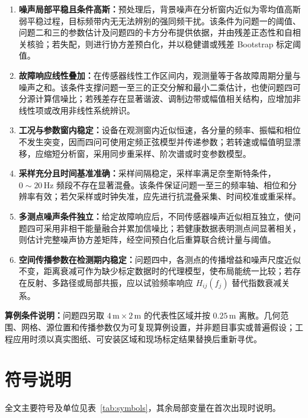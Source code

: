 \documentclass[withoutpreface,bwprint]{cumcmthesis}
\begin{document}
\begin{enumerate}[label=假设\arabic*：,leftmargin=4em]
    \item \textbf{噪声局部平稳且条件高斯：}预处理后，背景噪声在分析窗内近似为零均值高斯弱平稳过程，目标频带内无无法辨别的强同频干扰。该条件为问题一的阈值、问题二和三的参数估计及问题四的卡方分布提供依据，并由残差正态性和自相关核验；若失配，则进行协方差预白化，并以稳健谱或残差 Bootstrap 标定阈值。
    \item \textbf{故障响应线性叠加：}在传感器线性工作区间内，观测量等于各故障周期分量与噪声之和。该条件支撑问题一至三的正交分解和最小二乘估计，也使问题四可分源计算信噪比；若残差存在显著谐波、调制边带或幅值相关结构，应增加非线性项或改用非线性系统辨识。
    \item \textbf{工况与参数窗内稳定：}设备在观测窗内近似恒速，各分量的频率、振幅和相位不发生突变，因而四问可使用定频正弦模型并传递参数；若转速或幅值明显漂移，应缩短分析窗，采用同步重采样、阶次谱或时变参数模型。
    \item \textbf{采样充分且时间基准准确：}采样间隔稳定，采样率满足奈奎斯特条件，\(0\sim20\,\mathrm{Hz}\) 频段不存在显著混叠。该条件保证问题一至三的频率轴、相位和分辨率有效；若欠采样或时钟失准，应先进行抗混叠采集、时间校准或重采样。
    \item \textbf{多测点噪声条件独立：}给定故障响应后，不同传感器噪声近似相互独立，使问题四可采用非相干能量融合并累加信噪比；若健康数据表明测点间显著相关，则估计完整噪声协方差矩阵，经空间预白化后重算联合统计量与阈值。
    \item \textbf{空间传播参数在检测期内稳定：}问题四中，各测点的传播增益和噪声尺度近似不变，距离衰减可作为缺少标定数据时的代理模型，使布局能统一比较；若存在反射、多路径或局部共振，应以试验频率响应 \(H_{ij}(f_j)\) 替代指数衰减关系。
\end{enumerate}

\textbf{算例条件说明：}问题四另取 \(4\,\mathrm{m}\times2\,\mathrm{m}\) 的代表性区域并按 \(0.25\,\mathrm{m}\) 离散。几何范围、网格、源位置和传播参数仅为可复现算例设置，并非题目事实或普遍假设；工程应用时须以真实图纸、可安装区域和现场标定结果替换后重新寻优。

\section{符号说明}

全文主要符号及单位见表~\ref{tab:symbols}，其余局部变量在首次出现时说明。
\end{document}
